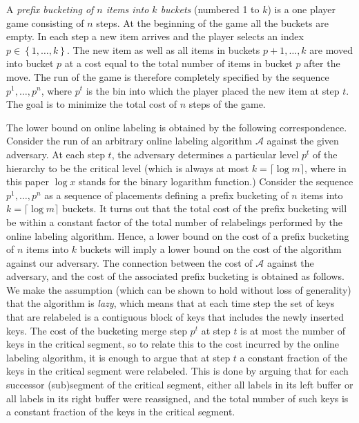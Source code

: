 \documentclass[11pt]{article}
\newcommand{\A}{\mathcal{A}}
\newcommand{\natInt}[2]{ \left\{ #1, \dotsc, #2 \right\} }
\begin{document}
A \emph{prefix bucketing of $n$ items into $k$  buckets} (numbered 1 to $k$) is a one player game consisting of $n$ steps.
At the beginning of the game
all the buckets are empty. In each step a new item arrives and the player selects an index $p \in \natInt{1}{k}$.
The new item as well as all items in buckets $p+1,\dotsc,k$ are moved into bucket $p$ at a cost equal to the
total number of items in bucket $p$ after the move.   The run of the game is therefore completely specified by
the sequence $p^1,\ldots,p^n$, where $p^t$ is the bin into which the player placed the new item at step $t$. 
The goal is to minimize the total cost of $n$ steps
of the game.

The lower bound on online labeling is obtained by the following correspondence.
Consider the run of an arbitrary online labeling algorithm $\A$
against the given adversary.  At each step $t$, the adversary determines a particular
level $p^t$ of the hierarchy to be the critical level (which is always at most $k=\lceil \log m \rceil$,
where in this paper $\log x$ stands for the binary logarithm function.)
 Consider the sequence $p^1,\ldots,p^n$ as a  sequence of placements defining a prefix bucketing
of $n$ items into $k=\lceil \log m \rceil$ buckets. It turns out that
the total cost of the prefix bucketing will be within a constant factor of  the total number of relabelings
performed by the online labeling algorithm. Hence, a lower bound on the cost of a prefix bucketing of $n$ items into $k$
buckets will imply a lower bound on the cost of the algorithm against our adversary.
The connection between the cost of $\A$ against the adversary, and the cost of the associated
prefix bucketing is obtained as follows.
We  make the assumption (which can be shown to hold without loss of generality) that the algorithm is \emph{lazy}, which means
that at each time step the set of keys that are relabeled is a contiguous block of keys that includes
the newly inserted keys.    The cost of the bucketing merge step $p^t$ at step $t$ 
is at most the number of keys in
the critical segment, so to relate this to the cost incurred by the online labeling algorithm, it is enough
to argue that at step $t$ a constant fraction of the keys in the critical segment were relabeled.  This is done
by arguing that  for each successor (sub)segment of the critical segment, either all labels in its left buffer
or all labels in its right buffer were reassigned, and the total number of such keys is a constant fraction of the keys
in the critical segment.
\end{document}
